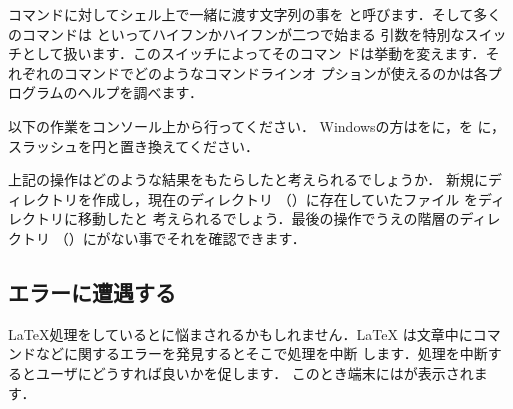 {{{{{%
コマンドに対してシェル上で一緒に渡す文字列の事を
と呼びます．そして多くのコマンドは
といってハイフン\qu{\str{-}}かハイフンが二つ\qu{\str-\str-}で始まる
引数を特別なスイッチとして扱います．このスイッチによってそのコマン
ドは挙動を変えます．それぞれのコマンドでどのようなコマンドラインオ
プションが使えるのかは各プログラムのヘルプを調べます．
%

\begin{Prob} 以下の作業をコンソール上から行ってください．
Windowsの方はをに，を
に，スラッシュ\qu{\str/}を円\qu{\texttt{\yen}}と置き換えてください．
\begin{InTerm}
\end{InTerm} 
上記の操作はどのような結果をもたらしたと考えられるでしょうか．
新規にディレクトリを作成し，現在のディレクトリ%
%
（）に存在していたファイル
をディレクトリに移動したと
考えられるでしょう．最後の操作でうえの階層のディレクトリ%
%
（）にがない事でそれを確認できます．
\end{Prob}

\subsection{エラーに遭遇する}
%
{\LaTeX}処理をしているとに悩まされるかもしれません．{\LaTeX}
は文章中にコマンドなどに関するエラーを発見するとそこで処理を中断
します．処理を中断するとユーザにどうすれば良いかを促します．
このとき端末にはが表示されます．

}}}}}
